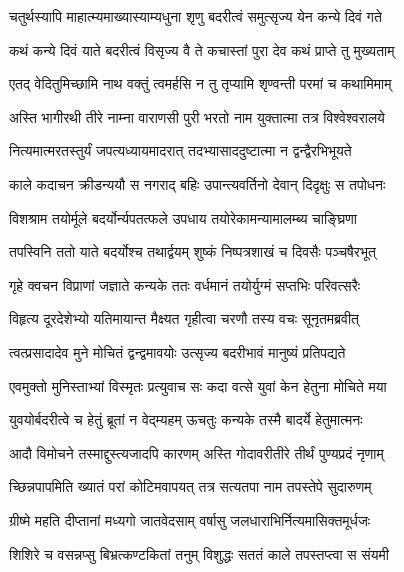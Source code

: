 
\twolineshloka
{चतुर्थस्यापि माहात्म्यमाख्यास्याम्यधुना शृणु}
{बदरीत्वं समुत्सृज्य येन कन्ये दिवं गते} %


\twolineshloka
{कथं कन्ये दिवं याते बदरीत्वं विसृज्य वै}
{ते कचास्तां पुरा देव कथं प्राप्ते तु मुख्यताम्} %

\twolineshloka
{एतद् वेदितुमिच्छामि नाथ वक्तुं त्वमर्हसि}
{न तु तृप्यामि शृण्वन्ती परमां च कथामिमाम्} %


\twolineshloka
{अस्ति भागीरथी तीरे नाम्ना वाराणसी पुरी}
{भरतो नाम युक्तात्मा तत्र विश्वेश्वरालये} %

\twolineshloka
{नित्यमात्मरतस्तुर्यं जपत्यध्यायमादरात्}
{तदभ्यासाददुष्टात्मा न द्वन्द्वैरभिभूयते} %

\twolineshloka
{काले कदाचन क्रीडन्ययौ स नगराद् बहिः}
{उपान्त्यवर्तिनो देवान् दिदृक्षुः स तपोधनः} %

\twolineshloka
{विशश्राम तयोर्मूले बदर्योर्न्यपतत्फले}
{उपधाय तयोरेकामन्यामालम्ब्य चाङ्घ्रिणा} %

\twolineshloka
{तपस्विनि ततो याते बदर्योश्च तथार्द्वयम्}
{शुष्कं निष्पत्रशाखं च दिवसैः पञ्चषैरभूत्} %

\twolineshloka
{गृहे क्वचन विप्राणां जज्ञाते कन्यके ततः}
{वर्धमानं तयोर्युग्मं सप्तभिः परिवत्सरैः} %

\twolineshloka
{विहृत्य दूरदेशेभ्यो यतिमायान्त मैक्ष्यत}
{गृहीत्वा चरणौ तस्य वचः सूनृतमब्रवीत्} %

\twolineshloka
{त्वत्प्रसादादेव मुने मोचितं द्वन्द्वमावयोः}
{उत्सृज्य बदरीभावं मानुष्यं प्रतिपद्यते} %

\twolineshloka
{एवमुक्तो मुनिस्ताभ्यां विस्मृतः प्रत्युवाच सः}
{कदा वत्से युवां केन हेतुना मोचिते मया} %

\twolineshloka
{युवयोर्बदरीत्वे च हेतुं ब्रूतां न वेद्म्यहम्}
{ऊचतुः कन्यके तस्मै बादर्ये हेतुमात्मनः} %

\twolineshloka
{आदौ विमोचने तस्माद्दुस्त्यजादपि कारणम्}
{अस्ति गोदावरीतीरे तीर्थं पुण्यप्रदं नृणाम्} %

\twolineshloka
{च्छिन्नपापमिति ख्यातं परां कोटिमवापयत्}
{तत्र सत्यतपा नाम तपस्तेपे सुदारुणम्} %

\twolineshloka
{ग्रीष्मे महति दीप्तानां मध्यगो जातवेदसाम्}
{वर्षासु जलधाराभिर्नित्यमासिक्तमूर्धजः} %

\twolineshloka
{शिशिरे च वसन्नप्सु बिभ्रत्कण्टकितां तनुम्}
{विशुद्धः सततं काले तपस्तप्त्वा स संयमी} %

